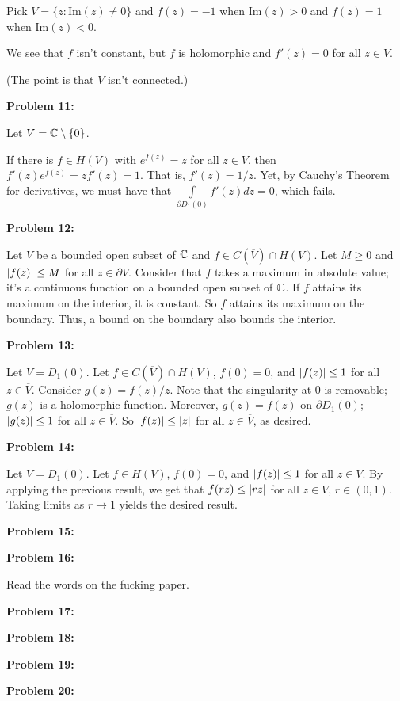\documentclass[a4paper,12pt]{article}
\begin{document}
Pick $V = \{z: \text{Im}(z) \neq 0\}$ and $f(z) = -1$ when $\text{Im}(z) >0$ and $f(z) = 1$ when $\text{Im}(z) < 0$.

We see that $f$ isn't constant, but $f$ is holomorphic and $f'(z) = 0$ for all $z \in V$.

(The point is that $V$ isn't connected.)

\shunt

{\bf Problem 11:}

Let $V = \mathbb{C} \setminus \{0\}$.

If there is $f \in H(V)$ with $e^{f(z)} = z$ for all $z \in V$, then $f'(z)e^{f(z)} =zf'(z)= 1$. That is, $f'(z) = 1/z$. Yet, by Cauchy's Theorem for derivatives, we must have that $\int\limits_{\partial D_1(0)} f'(z) dz = 0$, which fails.  

\shunt

{\bf Problem 12:}

Let $V$ be a bounded open subset of $\mathbb{C}$ and $f \in C(\overline{V}) \cap H(V)$. Let $M \geq 0$ and $\left\lvert f(z) \right\rvert \leq M$ for all $z \in \partial V$. Consider that $f$ takes a maximum in absolute value; it's a continuous function on a bounded open subset of $\mathbb{C}$. If $f$ attains its maximum on the interior, it is constant. So $f$ attains its maximum on the boundary. Thus, a bound on the boundary also bounds the interior. 

\shunt

{\bf Problem 13:}

Let $V = D_1(0)$. Let $f \in C(\overline{V}) \cap H(V)$, $f(0) = 0$, and $\left\lvert f(z) \right\rvert \leq 1$ for all $z \in \overline{V}$. Consider $g(z) = f(z)/z$. Note that the singularity at $0$ is removable; $g(z)$ is a holomorphic function. Moreover, $g(z) = f(z)$ on $\partial D_1(0)$; $\left\lvert g(z) \right\rvert \leq 1$ for all $z \in \overline{V}$. So $\left\lvert f(z) \right\rvert \leq \left\lvert z \right\rvert$ for all $z \in \overline{V}$, as desired. 

\shunt

{\bf Problem 14:}

Let $V = D_1(0)$. Let $f \in H(V)$, $f(0) = 0$, and $\left\lvert f(z) \right\rvert \leq 1$ for all $z \in V$. By applying the previous result, we get that $f(rz) \leq \left\lvert rz \right\rvert$ for all $z \in V$, $r \in (0,1)$. Taking limits as $r \to 1$ yields the desired result.  

\shunt

{\bf Problem 15:}

\shunt

{\bf Problem 16:}

Read the words on the fucking paper.

\shunt

{\bf Problem 17:}

\shunt

{\bf Problem 18:}

\shunt

{\bf Problem 19:}

\shunt

{\bf Problem 20:}

\shunt
\end{document}
